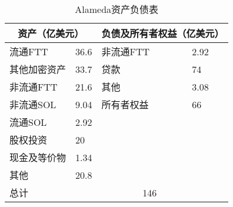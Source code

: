 \begin{table}[]
\caption{Alameda资产负债表}
\begin{tabular}{|llll|}
\hline
\multicolumn{2}{|c|}{资产（亿美元）}                            & \multicolumn{2}{c|}{负债及所有者权益（亿美元）} \\ \hline
\multicolumn{1}{|l|}{流通FTT}  & \multicolumn{1}{l|}{36.6} & \multicolumn{1}{l|}{非流通FTT} & 2.92 \\ \hline
\multicolumn{1}{|l|}{其他加密资产} & \multicolumn{1}{l|}{33.7} & \multicolumn{1}{l|}{贷款}     & 74   \\ \hline
\multicolumn{1}{|l|}{非流通FTT} & \multicolumn{1}{l|}{21.6} & \multicolumn{1}{l|}{其他}     & 3.08 \\ \hline
\multicolumn{1}{|l|}{非流通SOL} & \multicolumn{1}{l|}{9.04} & \multicolumn{1}{l|}{所有者权益}  & 66   \\ \hline
\multicolumn{1}{|l|}{流通SOL}  & \multicolumn{1}{l|}{2.92} &        &      \\ \hline
\multicolumn{1}{|l|}{股权投资}   & \multicolumn{1}{l|}{20}   &        &      \\ \hline
\multicolumn{1}{|l|}{现金及等价物} & \multicolumn{1}{l|}{1.34} &        &      \\ \hline
\multicolumn{1}{|l|}{其他}     & \multicolumn{1}{l|}{20.8} &        &      \\ \hline
\multicolumn{1}{|l|}{总计}     & \multicolumn{3}{c|}{146}                                       \\ \hline
\end{tabular}
\end{table}